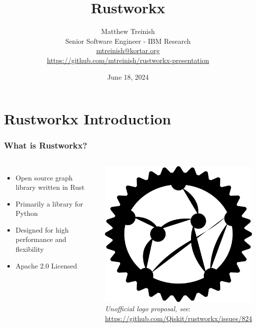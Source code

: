 \documentclass[aspectratio=169,11pt,hyperref={colorlinks=true}]{beamer}
\author[Matthew Treinish]{%
    \texorpdfstring{%
        \centering
        Matthew Treinish\\
        Senior Software Engineer - IBM Research\\
        \href{mailto:mtreinish@kortar.org}{mtreinish@kortar.org}\\
        \href{https://github.com/mtreinish/rustworkx-presentation}{https://github.com/mtreinish/rustworkx-presentation}
   }
   {Matthew Treinish}
}
\date{June 18, 2024}
\title{Rustworkx}
\begin{document}
\titlepage
\section{Rustworkx Introduction}
\begin{frame}
    \frametitle{What is Rustworkx?}
    \begin{columns}
            \begin{itemize}
                \item Open source graph library written in Rust
                \item Primarily a library for Python
                \item Designed for high performance and flexibility
                \item Apache 2.0 Licensed
            \end{itemize}
            \centering
            \includegraphics[width=.8\textwidth]{rustworkx_logo.png}\\
            \footnotesize
            \textit{Unofficial logo proposal, see}:\\ \href{https://github.com/Qiskit/rustworkx/issues/824}{https://github.com/Qiskit/rustworkx/issues/824}
    \end{columns}
\end{frame}
\end{document}
